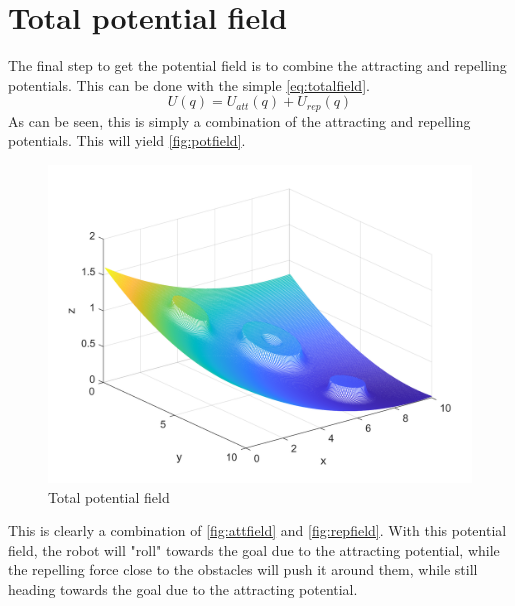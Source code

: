 \documentclass[11pt]{article}
\begin{document}
    \section{Total potential field}\label{sec:totfield}
    The final step to get the potential field is to combine the attracting and repelling potentials.
    This can be done with the simple \autoref{eq:totalfield}.
    \begin{equation}\label{eq:totalfield}
        U(q)=U_{a t t}(q)+U_{r e p}(q)
    \end{equation}
    As can be seen, this is simply a combination of the attracting and repelling potentials.
    This will yield \autoref{fig:potfield}.
    \begin{figure}[H]
        \centering
        \includegraphics[width=1.0\textwidth]{../test/images/u_combi}
        \caption{Total potential field}
        \label{fig:potfield}
    \end{figure}
    This is clearly a combination of \autoref{fig:attfield} and \autoref{fig:repfield}.
    With this potential field, the robot will "roll" towards the goal due to the attracting potential, while the repelling force close to the obstacles will push it around them, while still heading towards the goal due to the attracting potential.
\end{document}

